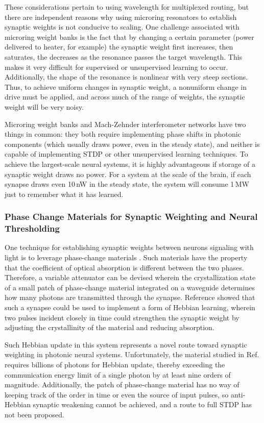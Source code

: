 These considerations pertain to using wavelength for multiplexed routing, but there are independent reasons why using microring resonators to establish synaptic weights is not conducive to scaling. One challenge associated with microring weight banks is the fact that by changing a certain parameter (power delivered to heater, for example) the synaptic weight first increases, then saturates, the decreases as the resonance passes the target wavelength. This makes it very difficult for supervised or unsupervised learning to occur. Additionally, the shape of the resonance is nonlinear with very steep sections. Thus, to achieve uniform changes in synaptic weight, a nonuniform change in drive must be applied, and across much of the range of weights, the synaptic weight will be very noisy.

Microring weight banks and Mach-Zehnder interferometer networks have two things in common: they both require implementing phase shifts in photonic components (which usually draws power, even in the steady state), and neither is capable of implementing STDP or other unsupervised learning techniques. To achieve the largest-scale neural systems, it is highly advantageous if storage of a synaptic weight draws no power. For a system at the scale of the brain, if each synapse draws even 10\,nW in the steady state, the system will consume 1\,MW just to remember what it has learned. 

\cite{tafe2019}

\subsubsection{Phase Change Materials for Synaptic Weighting and Neural Thresholding}
One technique for establishing synaptic weights between neurons signaling with light is to leverage phase-change materials \cite{chri2017}. Such materials have the property that the coefficient of optical absorption is different between the two phases. Therefore, a variable attenuator can be devised wherein the crystallization state of a small patch of phase-change material integrated on a waveguide determines how many photons are transmitted through the synapse. Reference \cite{chri2017} showed that such a synapse could be used to implement a form of Hebbian learning, wherein two pulses incident closely in time could strengthen the synaptic weight by adjusting the crystallinity of the material and reducing absorption. 

Such Hebbian update in this system represents a novel route toward synaptic weighting in photonic neural systems. Unfortunately, the material studied in Ref.\,\cite{chri2017} requires billions of photons for Hebbian update, thereby exceeding the communication energy limit of a single photon by at least nine orders of magnitude. Additionally, the patch of phase-change material has no way of keeping track of the order in time or even the source of input pulses, so anti-Hebbian synaptic weakening cannot be achieved, and a route to full STDP has not been proposed. 

